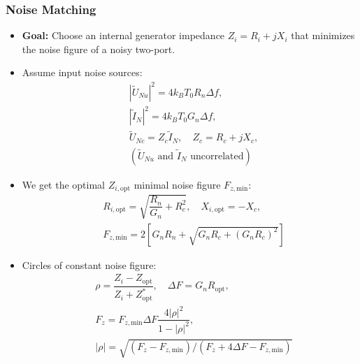 \subsubsection{Noise Matching}
\begin{itemize}
    \item \textbf{Goal:} Choose an internal generator impedance $Z_i=R_i + jX_i$ that minimizes the noise figure of a noisy two-port.
    \item Assume input noise sources:
        \begin{align*}
            &|\tilde{U}_{Nu}|^2 = 4k_B T_0 R_n \Delta f,\\
            &|\tilde{I}_{N}|^2 = 4k_B T_0 G_n \Delta f,\\
            &\tilde{U}_{Nc} = Z_c \tilde{I}_N, \quad Z_c=R_c + jX_c,\\
            &(\tilde{U}_{Nu}\text{ and }\tilde{I}_N\text{ uncorrelated})
        \end{align*}
    \item We get the optimal $Z_{i,\mathrm{opt}}$ minimal noise figure $F_{z,\mathrm{min}}$:
        \begin{align*}
            &R_{i, \mathrm{opt}} = \sqrt{\dfrac{R_n}{G_n} + R_c^2},\quad X_{i, \mathrm{opt}} = -X_c,\\
            &F_{z,\mathrm{min}} = 2\left[G_n R_n + \sqrt{G_n R_c + (G_n R_c)^2}\right]
        \end{align*}
    \item Circles of constant noise figure:
        \begin{align*}
            &\rho = \dfrac{Z_i - Z_{\mathrm{opt}}}{Z_i + Z_{\mathrm{opt}}^*}, \quad
            \Delta F = G_n R_{\mathrm{opt}},\\
            &F_z = F_{z,\mathrm{min}} \Delta F \dfrac{4|\rho|^2}{1 - |\rho|^2},\\
            &|\rho| = \sqrt{(F_z - F_{z,\mathrm{min}}) / (F_z + 4\Delta F - F_{z,\mathrm{min}})}\\
        \end{align*}
\end{itemize}
